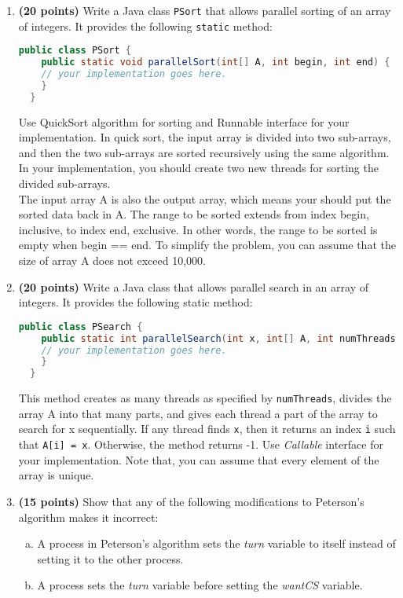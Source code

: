\documentclass[11pt]{article}
\newcounter{problem}
\begin{document}
\begin{enumerate}
\item \textbf{(20 points)} Write a Java class \texttt{PSort} that allows
  parallel sorting of an array of integers. It provides the following
  \texttt{static} method: \\

  \begin{lstlisting}[language=Java]
  public class PSort {
    public static void parallelSort(int[] A, int begin, int end) {
    // your implementation goes here.
    }
  }
  \end{lstlisting}

  Use QuickSort algorithm for sorting and Runnable interface for your
  implementation. In quick sort, the input array is divided into two sub-arrays,
  and then the two sub-arrays are sorted recursively using the same
  algorithm. In your implementation, you should create two new threads for
  sorting the divided
  sub-arrays. \\

  The input array A is also the output array, which means your should put the
  sorted data back in A.  The range to be sorted extends from index begin,
  inclusive, to index end, exclusive. In other words, the range to be sorted is
  empty when begin == end. To simplify the problem, you can assume that the size
  of array A does not exceed 10,000.

\item \textbf{(20 points)} Write a Java class that allows parallel search in an
  array of integers. It provides the following static method:

  \begin{lstlisting}[language=Java]
  public class PSearch {
    public static int parallelSearch(int x, int[] A, int numThreads) {
    // your implementation goes here.
    }
  }
  \end{lstlisting}

  This method creates as many threads as specified by \texttt{numThreads},
  divides the array A into that many parts, and gives each thread a part of the
  array to search for x sequentially. If any thread finds \texttt{x}, then it
  returns an index \texttt{i} such that \texttt{A[i] = x}. Otherwise, the method
  returns -1. Use \emph{Callable} interface for your implementation. Note that,
  you can assume that every element of the array is unique.

\item \textbf{(15 points)} Show that any of the following modifications to
  Peterson’s algorithm makes it incorrect:
  \begin{enumerate}[a)]
  \item A process in Peterson’s algorithm sets the \emph{turn} variable to
    itself instead of setting it to the other process.
  \item A process sets the \emph{turn} variable before setting the \emph{wantCS}
    variable.
  \end{enumerate}


\end{enumerate}
\end{document}
